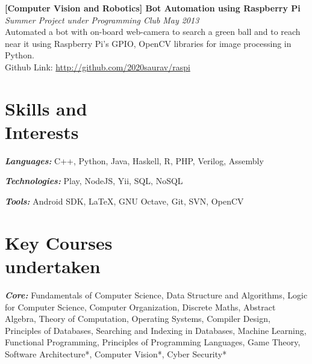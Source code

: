 \documentclass[margin,10pt]{resume}
\begin{document}
\begin{resume}
\begin{list2}

\item\textbf{[Computer Vision and Robotics] Bot Automation using Raspberry Pi} \\
    \textsl{Summer Project under Programming Club} \hfill \emph{May 2013}\\
	Automated a bot with on-board web-camera to search a green ball and to reach near it using Raspberry Pi's GPIO, OpenCV libraries for image processing in Python.\\
	Github Link: \url{http://github.com/2020saurav/raspi}

\end{list2}

\newpage

\section{\mysidestyle Skills and\\Interests}
\begin{list2}
	\item \emph{\textbf {Languages:}} C++, Python, Java, Haskell, R, PHP, Verilog, Assembly
	\vspace{1mm}
	\item \emph{\textbf{Technologies:}} Play, NodeJS, Yii, SQL, NoSQL
	\vspace{1mm}
	\item \emph{\textbf{Tools:}} Android SDK, \LaTeX, GNU Octave, Git, SVN, OpenCV
\end{list2}


\section{\mysidestyle Key Courses\\undertaken }
\begin{list2}
	\item \emph{\textbf{Core:}} Fundamentals of Computer Science, Data Structure and Algorithms, Logic for Computer Science, Computer Organization, Discrete Maths, Abstract Algebra, Theory of Computation, Operating Systems, Compiler Design, Principles of Databases, Searching and Indexing in Databases, Machine Learning, Functional Programming, Principles of Programming Languages, Game Theory, Software Architecture*, Computer Vision*, Cyber Security*


\end{list2}
\end{resume}
\end{document}
